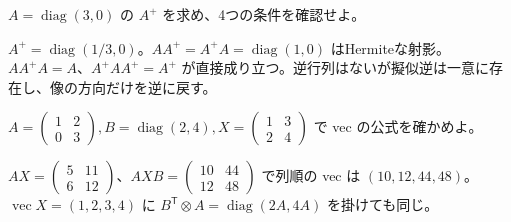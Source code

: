 \documentclass[11pt]{article}
\begin{document}
\newpage
{}
$A=\operatorname{diag}(3,0)$ の $A^+$ を求め、4つの条件を確認せよ。
\begin{ans}
$A^+=\operatorname{diag}(1/3,0)$。$AA^+=A^+A=\operatorname{diag}(1,0)$ はHermiteな射影。$AA^+A=A$、$A^+AA^+=A^+$ が直接成り立つ。逆行列はないが擬似逆は一意に存在し、像の方向だけを逆に戻す。
\end{ans}
\problem[列ベクトル化]
$A=\begin{pmatrix}1&2\\0&3\end{pmatrix},B=\operatorname{diag}(2,4),X=\begin{pmatrix}1&3\\2&4\end{pmatrix}$ で vec の公式を確かめよ。
\begin{ans}
$AX=\begin{pmatrix}5&11\\6&12\end{pmatrix}$、$AXB=\begin{pmatrix}10&44\\12&48\end{pmatrix}$ で列順の vec は $(10,12,44,48)$。$\operatorname{vec}X=(1,2,3,4)$ に $B^{\mathsf T}\otimes A=\operatorname{diag}(2A,4A)$ を掛けても同じ。
\end{ans}
\end{document}
